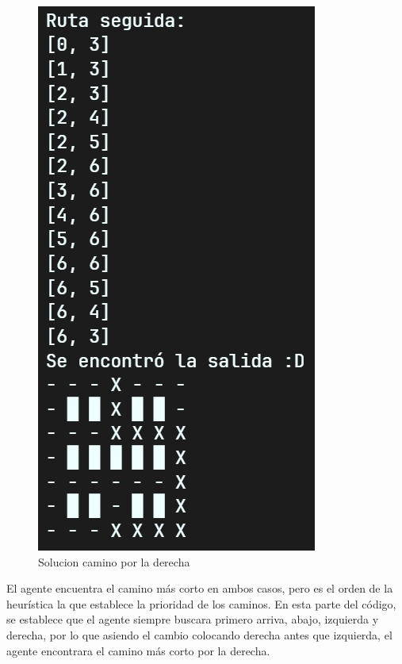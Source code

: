 \begin{figure}[H]
\begin{minipage}[b]{0.2\textwidth}
      \includegraphics[width=\textwidth]{IMA/RLaberinto2_2.png}
      \caption{Solucion camino por la derecha}
    \end{minipage}
  \end{figure}

El agente encuentra el camino más corto en ambos casos, pero es el orden de la heurística la que establece
la prioridad de los caminos. En esta parte del código, se establece que el agente siempre buscara
primero arriva, abajo, izquierda y derecha, por lo que asiendo el cambio colocando derecha antes que izquierda, el agente
encontrara el camino más corto por la derecha.

